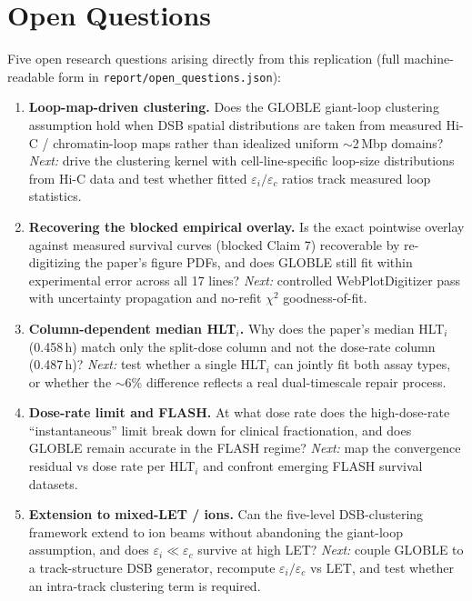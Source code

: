 \section*{Open Questions}
Five open research questions arising directly from this replication (full machine-readable
form in \texttt{report/open\_questions.json}):

\begin{enumerate}
\item[\textbf{Q1}] \textbf{Loop-map-driven clustering.} Does the GLOBLE giant-loop
clustering assumption hold when DSB spatial distributions are taken from measured
Hi-C / chromatin-loop maps rather than idealized uniform $\sim$2\,Mbp domains?
\emph{Next:} drive the clustering kernel with cell-line-specific loop-size
distributions from Hi-C data and test whether fitted $\varepsilon_i/\varepsilon_c$
ratios track measured loop statistics.

\item[\textbf{Q2}] \textbf{Recovering the blocked empirical overlay.} Is the exact
pointwise overlay against measured survival curves (blocked Claim 7) recoverable by
re-digitizing the paper's figure PDFs, and does GLOBLE still fit within experimental
error across all 17 lines? \emph{Next:} controlled WebPlotDigitizer pass with
uncertainty propagation and no-refit $\chi^2$ goodness-of-fit.

\item[\textbf{Q3}] \textbf{Column-dependent median HLT$_i$.} Why does the paper's
median HLT$_i$ (0.458\,h) match only the split-dose column and not the dose-rate
column (0.487\,h)? \emph{Next:} test whether a single HLT$_i$ can jointly fit both
assay types, or whether the $\sim$6\% difference reflects a real dual-timescale
repair process.

\item[\textbf{Q4}] \textbf{Dose-rate limit and FLASH.} At what dose rate does the
high-dose-rate ``instantaneous'' limit break down for clinical fractionation, and
does GLOBLE remain accurate in the FLASH regime? \emph{Next:} map the convergence
residual vs dose rate per HLT$_i$ and confront emerging FLASH survival datasets.

\item[\textbf{Q5}] \textbf{Extension to mixed-LET / ions.} Can the five-level
DSB-clustering framework extend to ion beams without abandoning the giant-loop
assumption, and does $\varepsilon_i \ll \varepsilon_c$ survive at high LET?
\emph{Next:} couple GLOBLE to a track-structure DSB generator, recompute
$\varepsilon_i/\varepsilon_c$ vs LET, and test whether an intra-track clustering
term is required.
\end{enumerate}

